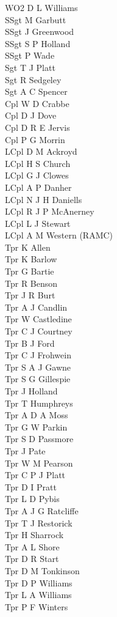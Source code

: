 \begin{multicols}{2}
  \noindent
  WO2 D L Williams \\
  SSgt M Garbutt \\
  SSgt J Greenwood \\
  SSgt S P Holland \\
  SSgt P Wade \\
  Sgt T J Platt \\
  Sgt R Sedgeley \\
  Sgt A C Spencer \\
  Cpl W D Crabbe \\
  Cpl D J Dove \\
  Cpl D R E Jervis \\
  Cpl P G Morrin \\
  LCpl D M Ackroyd \\
  LCpl H S Church \\
  LCpl G J Clowes \\
  LCpl A P Danher \\
  LCpl N J H Daniells \\
  LCpl R J P McAnerney \\
  LCpl L J Stewart \\
  LCpl A M Western (RAMC) \\
  Tpr K Allen \\
  Tpr K Barlow \\
  Tpr G Bartie \\
  Tpr R Benson \\
  Tpr J R Burt \\
  Tpr A J Candlin \\
  Tpr W Castledine \\
  Tpr C J Courtney \\
  Tpr B J Ford \\
  Tpr C J Frohwein \\
  Tpr S A J Gawne \\
  Tpr S G Gillespie \\
  Tpr J Holland \\
  Tpr T Humphreys \\
  Tpr A D A Moss \\
  Tpr G W Parkin \\
  Tpr S D Passmore \\
  Tpr J Pate \\
  Tpr W M Pearson \\
  Tpr C P J Platt \\
  Tpr D I Pratt \\
  Tpr L D Pybis \\
  Tpr A J G Ratcliffe \\
  Tpr T J Restorick \\
  Tpr H Sharrock \\
  Tpr A L Shore \\
  Tpr D R Start \\
  Tpr D M Tonkinson \\
  Tpr D P Williams \\
  Tpr L A Williams \\
  Tpr P F Winters \\
\end{multicols}


